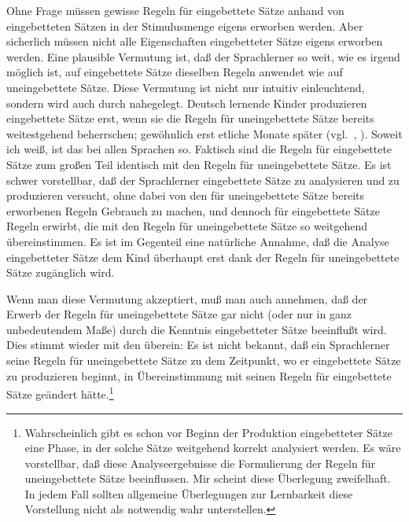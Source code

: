 \documentclass[output=paper]{langsci/langscibook}
\begin{document}
Ohne Frage müssen gewisse Regeln für eingebettete Sätze anhand von eingebetteten Sätzen in der Stimulusmenge eigens erworben werden. Aber sicherlich müssen
nicht alle Eigenschaften eingebetteter Sätze eigens erworben werden. Eine plausible
Vermutung ist, daß der Sprachlerner so weit, wie es irgend möglich ist, auf eingebettete Sätze dieselben Regeln anwendet wie auf uneingebettete Sätze. Diese Vermutung ist nicht nur intuitiv einleuchtend, sondern wird auch durch  nahegelegt. Deutsch lernende Kinder produzieren eingebettete Sätze erst, wenn
sie die Regeln für uneingebettete Sätze bereits weitestgehend beherrschen; gewöhnlich erst etliche Monate später (vgl.\ \citealt{Park1981}, \citealt{Clahsen1982}). Soweit ich weiß, ist
das bei allen Sprachen so. Faktisch sind die Regeln für eingebettete Sätze zum großen Teil identisch mit den Regeln für uneingebettete Sätze. Es ist schwer vorstellbar,
daß der Sprachlerner eingebettete Sätze zu analysieren und zu produzieren versucht,
ohne dabei von den für uneingebettete Sätze bereits erworbenen Regeln Gebrauch
zu machen, und dennoch für eingebettete Sätze Regeln erwirbt, die mit den Regeln
für uneingebettete Sätze so weitgehend übereinstimmen. Es ist im Gegenteil eine
natürliche Annahme, daß die Analyse eingebetteter Sätze dem Kind überhaupt erst
dank der Regeln für uneingebettete Sätze zugänglich wird.

Wenn man diese Vermutung akzeptiert, muß man auch annehmen, daß der Erwerb der Regeln für uneingebettete Sätze gar nicht (oder nur in ganz unbedeutendem Maße) durch die Kenntnis eingebetteter Sätze beeinflußt wird. Dies stimmt wieder mit den  überein: Es ist nicht bekannt, daß ein Sprachlerner
seine Regeln für uneingebettete Sätze zu dem Zeitpunkt, wo er eingebettete Sätze zu
produzieren beginnt, in Übereinstimmung mit seinen Regeln für eingebettete Sätze
geändert hätte.\footnote{%
  Wahrscheinlich gibt es schon vor Beginn der Produktion eingebetteter Sätze eine Phase, in der
  solche Sätze weitgehend korrekt analysiert werden. Es wäre vorstellbar, daß diese
  Analyseergebnisse die Formulierung der Regeln für uneingebettete Sätze beeinflussen. Mir scheint
  diese Überlegung zweifelhaft. In jedem Fall sollten allgemeine Überlegungen zur Lernbarkeit diese
  Vorstellung nicht als notwendig wahr unterstellen.%
}
\end{document}
